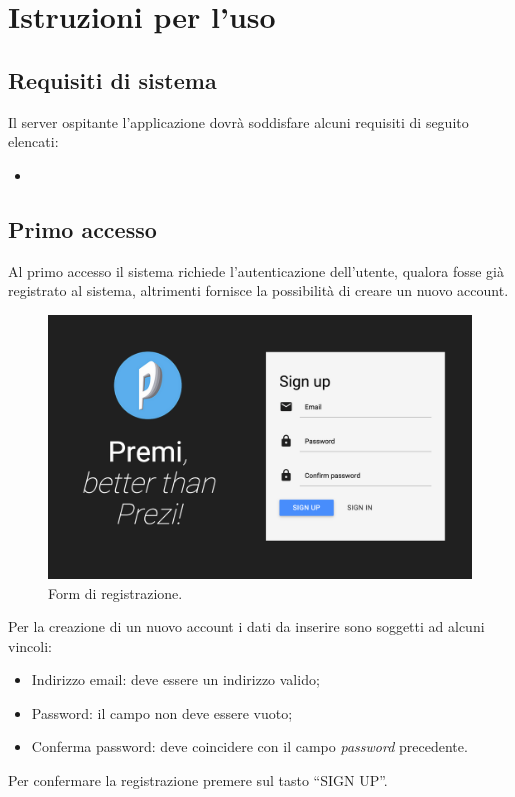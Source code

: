 \section{Istruzioni per l'uso}
\subsection{Requisiti di sistema}
Il server ospitante l'applicazione dovrà soddisfare alcuni requisiti di seguito elencati:
\begin{itemize}
\item 
\end{itemize}

\newpage
\subsection{Primo accesso}
Al primo accesso il sistema richiede l'autenticazione dell'utente, qualora fosse già registrato al sistema, altrimenti fornisce la possibilità di creare un nuovo account.
\begin{figure}[!h]
\begin{center}
\includegraphics[scale=0.4]{img/signup.png}
\caption{Form di registrazione.}
\end{center}
\end{figure}

Per la creazione di un nuovo account i dati da inserire sono soggetti ad alcuni vincoli:
\begin{itemize}
\item Indirizzo email: deve essere un indirizzo valido;
\item Password: il campo non deve essere vuoto;
\item Conferma password: deve coincidere con il campo \emph{password} precedente.
\end{itemize}
Per confermare la registrazione premere sul tasto ``SIGN UP''.

